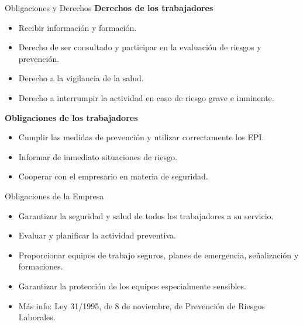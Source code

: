 \documentclass{beamer}
\begin{document}
\begin{frame}{Obligaciones y Derechos}
    \textbf{Derechos de los trabajadores}
    \begin{itemize}
        \item Recibir información y formación.
        \item Derecho de ser consultado y participar en la evaluación de riesgos y prevención.
        \item Derecho a la vigilancia de la salud.
        \item Derecho a interrumpir la actividad en caso de riesgo grave e inminente.
    \end{itemize}
    \vspace{2mm}
    \textbf{Obligaciones de los trabajadores}
    \begin{itemize}
        \item Cumplir las medidas de prevención y utilizar correctamente los EPI.
        \item Informar de inmediato situaciones de riesgo.
        \item Cooperar con el empresario en materia de seguridad.
    \end{itemize}
\end{frame}

\begin{frame}{Obligaciones de la Empresa}
    \begin{itemize}
        \item Garantizar la seguridad y salud de todos los trabajadores a su servicio.
        \item Evaluar y planificar la actividad preventiva.
        \item Proporcionar equipos de trabajo seguros, planes de emergencia, señalización y formaciones.
        \item Garantizar la protección de los equipos especialmente sensibles.
        \item Más info: Ley 31/1995, de 8 de noviembre, de Prevención de Riesgos Laborales.
    \end{itemize}
\end{frame}
\end{document}
